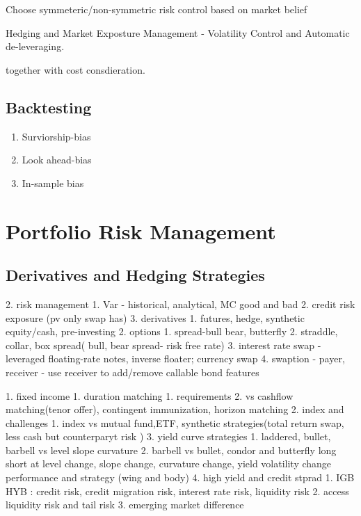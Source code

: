 \documentclass[11pt, openany]{book}              %
\begin{document}
Choose symmeteric/non-symmetric risk control based on market belief

Hedging and Market Exposture Management - Volatility Control and Automatic de-leveraging. 

together with cost consdieration. 

\section{Backtesting}

\begin{enumerate}
 \item Surviorship-bias
 \item Look ahead-bias
 \item In-sample bias
\end{enumerate}

\chapter{Portfolio Risk Management}

\section{Derivatives and Hedging Strategies}

2. risk management
    1. Var - historical, analytical, MC good and bad
    2. credit risk exposure (pv only swap has)
3. derivatives  
    1. futures, hedge, synthetic equity/cash, pre-investing
    2. options
        1. spread-bull bear, butterfly   
        2. straddle, collar, box spread( bull, bear spread- risk free rate)
        3. interest rate swap - leveraged floating-rate notes, inverse floater; currency swap
        4. swaption - payer, receiver - use receiver to add/remove callable bond features 


1. fixed income
    1. duration matching 
        1. requirements
        2. vs cashflow matching(tenor offer), contingent immunization, horizon matching
    2. index and challenges 
        1. index vs mutual fund,ETF, synthetic strategies(total return swap, less cash but counterparyt risk )
    3. yield curve strategies
        1. laddered, bullet, barbell vs level slope curvature
        2. barbell vs bullet, condor and butterfly long short at level change, slope change, curvature change, yield volatility change performance and strategy (wing and body)
    4. high yield and credit stprad
        1. IGB HYB : credit risk, credit migration risk, interest rate risk, liquidity risk
        2. access liquidity risk and tail risk 
        3. emerging market difference 
\end{document}
